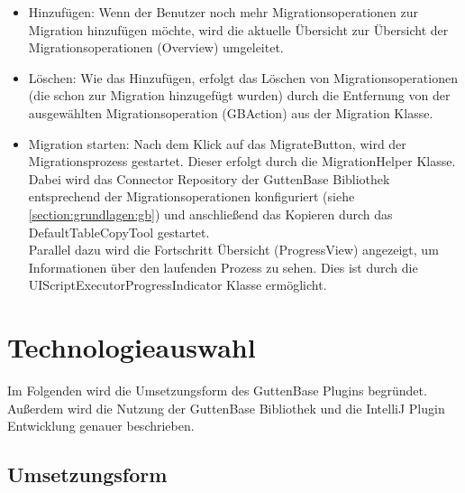 	\begin{itemize}
		\item Hinzufügen: Wenn der Benutzer noch mehr Migrationsoperationen zur Migration hinzufügen möchte, wird die aktuelle Übersicht zur Übersicht der Migrationsoperationen (Overview) umgeleitet.
		\item Löschen: Wie das Hinzufügen, erfolgt das Löschen von Migrationsoperationen (die schon zur Migration hinzugefügt wurden) durch die Entfernung von der ausgewählten Migrationsoperation (GBAction) aus der Migration Klasse. 
		\item Migration starten: Nach dem Klick auf das \glqq Migrate\grqq Button, wird der Migrationsprozess gestartet. Dieser erfolgt durch die MigrationHelper Klasse. Dabei wird das Connector Repository der GuttenBase Bibliothek entsprechend der Migrationsoperationen konfiguriert (siehe \ref{section:grundlagen:gb}) und anschließend das Kopieren durch das DefaultTableCopyTool gestartet. \\
		Parallel dazu wird die Fortschritt Übersicht (ProgressView) angezeigt, um Informationen über den laufenden Prozess zu sehen. Dies ist durch die UIScriptExecutorProgressIndicator Klasse ermöglicht.
		
	\end{itemize}


\section{Technologieauswahl}
	Im Folgenden wird die Umsetzungsform des GuttenBase Plugins begründet. Außerdem wird die Nutzung der GuttenBase Bibliothek und die IntelliJ Plugin Entwicklung genauer beschrieben.
\subsection{Umsetzungsform}

